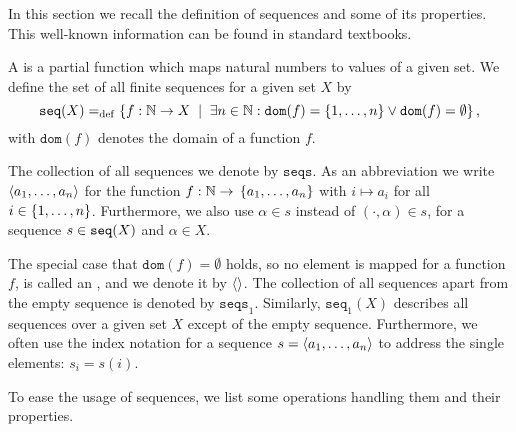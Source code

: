 In this section we recall the definition of sequences and some of its properties. This well-known information can be found in standard textbooks.

\begin{definition}[Sequence]
\label{def_seq}
A  is a partial function which maps natural numbers to values of a given set. We define the set of all finite sequences for a given set $X$ by
\[\seqset{X}\define\set[\exists{}n\in\N:\texttt{dom}(f) = \set{1,\ldots,n} \vee \texttt{dom}(f)=\emptyset]{f:\N\rightarrow{}X},\]
with $\texttt{dom}(f)$ denotes the domain of a function $f$.


The collection of all sequences we denote by $\texttt{seqs}$. As an abbreviation we write $\langle a_1,\ldots,a_n\rangle$ for the function $f:\N\rightarrow{}\set{a_1,\ldots,a_n}$ with $i\mapsto{}a_i$ for all $i\in\set{1,\ldots,n}$. Furthermore, we also use $\alpha\in{}s$ instead of $(\cdot,\alpha)\in{}s$, for a sequence $s\in\mathtt{seq}(X)$ and $\alpha\in{}X$.

The special case that $\texttt{dom}(f)=\emptyset$ holds, so no element is mapped for a function $f$, is called an , and we denote it by $\langle\rangle{}$. The collection of all sequences apart from the empty sequence is denoted by $\texttt{seqs}_1$. Similarly, $\texttt{seq}_1(X)$ describes all sequences over a given set $X$ except of the empty sequence. Furthermore, we often use the index notation for a sequence $s=\langle a_1,\ldots,a_n\rangle$ to address the single elements: $s_i=s(i)$.
\end{definition}

To ease the usage of sequences, we list some operations handling them and their properties.

